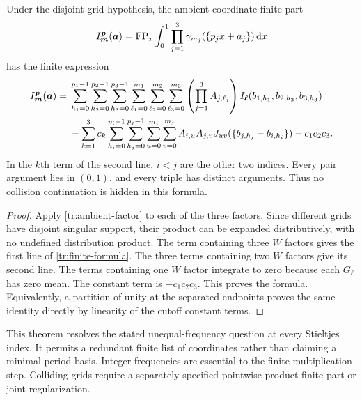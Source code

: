 \begin{theorem}
\label{tr:finite-transport}
Under the disjoint-grid hypothesis, the ambient-coordinate finite part
\[
 I^{\boldsymbol p}_{\boldsymbol m}(\boldsymbol a)
 =\operatorname{FP}_x\int_0^1\prod_{j=1}^3
                 \gamma_{m_j}(\{p_jx+a_j\})\,\mathrm d x
\]
has the finite expression
\begin{align}
 I^{\boldsymbol p}_{\boldsymbol m}(\boldsymbol a)
 ={}&\sum_{h_1=0}^{p_1-1}\sum_{h_2=0}^{p_2-1}\sum_{h_3=0}^{p_3-1}
       \sum_{\ell_1=0}^{m_1}\sum_{\ell_2=0}^{m_2}\sum_{\ell_3=0}^{m_3}
       \left(\prod_{j=1}^3A_{j,\ell_j}\right)
       I_{\boldsymbol\ell}(b_{1,h_1},b_{2,h_2},b_{3,h_3})
       \notag\\
 &-\sum_{k=1}^3c_k
    \sum_{h_i=0}^{p_i-1}\sum_{h_j=0}^{p_j-1}
    \sum_{u=0}^{m_i}\sum_{v=0}^{m_j}
        A_{i,u}A_{j,v}
        J_{uv}(\{b_{j,h_j}-b_{i,h_i}\})
       -c_1c_2c_3 .\label{tr:finite-formula}
\end{align}
In the $k$th term of the second line, $i<j$ are the other two indices.
Every pair argument lies in $(0,1)$, and every triple has distinct
arguments. Thus no collision continuation is hidden in this formula.
\end{theorem}
\begin{proof}
Apply \eqref{tr:ambient-factor} to each of the three factors. Since
different grids have disjoint singular support, their product can be
expanded distributively, with no undefined distribution product. The
term containing three $W$ factors gives the first line of
\eqref{tr:finite-formula}. The three terms containing two $W$ factors
give its second line. The terms containing one $W$ factor integrate to
zero because each $G_\ell$ has zero mean. The constant term is
$-c_1c_2c_3$. This proves the formula. Equivalently, a partition of unity
at the separated endpoints proves the same identity directly by linearity
of the cutoff constant terms.
\end{proof}

This theorem resolves the stated unequal-frequency question at every
Stieltjes index. It permits a redundant finite list of coordinates rather
than claiming a minimal period basis. Integer frequencies are essential
to the finite multiplication step. Colliding grids require a separately
specified pointwise product finite part or joint regularization.

